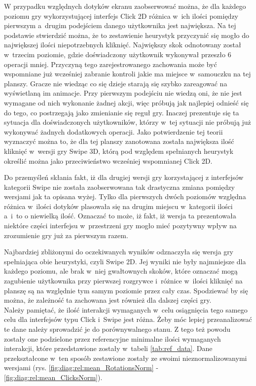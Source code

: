 \documentclass[a4paper,12pt,numbers=noenddot]{report}
\begin{document}
W przypadku względnych dotyków ekranu zaobserwować można, że dla każdego poziomu gry wykorzystującej interfejs Click 2D różnica w~ich ilości pomiędzy pierwszym a~drugim podejściem danego użytkownika jest największa. Na tej podstawie stwierdzić można, że to zestawienie heurystyk przyczynić się mogło do największej ilości niepotrzebnych kliknięć. Największy skok odnotowany został w~trzecim poziomie, gdzie doświadczony użytkownik wykonywał przeszło 6 operacji mniej. Przyczyną tego zarejestrowanego zachowania może być wspomniane już wcześniej zabranie kontroli jakie ma miejsce w~samouczku na tej planszy. Gracze nie wiedząc co się dzieje starają się szybko zareagować na wyświetlaną im animacje. Przy pierwszym podejściu nie wiedzą oni, że nie jest wymagane od nich wykonanie żadnej akcji, więc próbują jak najlepiej odnieść się do tego, co postrzegają jako zmienianie się reguł gry.
Inaczej prezentuje się ta sytuacja dla doświadczonych użytkowników, którzy w~tej sytuacji nie próbują już wykonywać żadnych dodatkowych operacji. Jako potwierdzenie tej teorii wyznaczyć można to, że dla tej planszy zanotowana została największa ilość kliknięć w~wersji gry Swipe 3D, którą pod względem spełnianych heurystyk określić można jako przeciwieństwo wcześniej wspomnianej Click 2D.

Do przemyśleń skłania fakt, iż dla drugiej wersji gry korzystającej z interfejsów kategorii Swipe nie została zaobserwowana tak drastyczna zmiana pomiędzy wersjami jak ta opisana wyżej. Tylko dla pierwszych dwóch poziomów względna różnica w~ilości dotyków plasowała się na drugim miejscu w~kategorii ilości a~i~to o niewielką ilość. Oznaczać to może, iż fakt, iż wersja ta prezentowała niektóre części interfejsu w~przestrzeni gry mogło mieć pozytywny wpływ na zrozumienie gry już za pierwszym razem.

Najbardziej zbliżonymi do oczekiwanych wyników odznaczyła się wersja gry spełniająca obie heurystyki, czyli Swipe 2D. Jej wyniki nie były najmniejsze dla każdego poziomu, ale brak w~niej gwałtownych skoków, które oznaczać mogą zagubienie użytkownika przy pierwszej rozgrywce i~różnice w~ilości kliknięć na planszę są na względnie tym samym poziomie przez cały czas. Spodziewać by się można, że zależność ta zachowana jest również dla dalszej części gry.\\

Należy pamiętać, że ilość interakcji wymaganych w~celu osiągnięcia tego samego celu dla interfejsów typu Click i~Swipe jest różna. Żeby móc lepiej przeanalizować te dane należy sprowadzić je do porównywalnego stanu. Z tego też powodu zostały one podzielone przez referencyjne minimalne ilości wymaganych interakcji, które przedstawione zostały w~tabeli \ref{tab:ref_data}. Dane przekształcone w~ten sposób zestawione zostały ze swoimi nieznormalizowanymi wersjami (rys. \ref{fig:diag:rel:mean_RotationsNorm} - \ref{fig:diag:rel:mean_ClicksNorm}).
\end{document}
